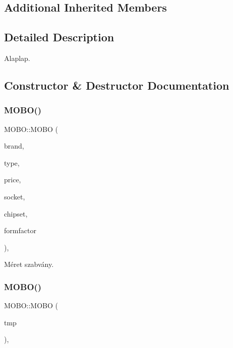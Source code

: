 \subsection*{Additional Inherited Members}


\subsection{Detailed Description}
Alaplap. 

\subsection{Constructor \& Destructor Documentation}
\mbox{\label{class_m_o_b_o_a3185de871765391ae3a0ffe4b0af7e5b}} 
\subsubsection{\texorpdfstring{MOBO()}{MOBO()}\hspace{0.1cm}{\footnotesize\ttfamily [1/2]}}
{\footnotesize\ttfamily M\+O\+B\+O\+::\+M\+O\+BO (\begin{DoxyParamCaption}\item[{\mbox{\hyperlink{class_string}{String}}}]{brand,  }\item[{\mbox{\hyperlink{class_string}{String}}}]{type,  }\item[{int}]{price,  }\item[{\mbox{\hyperlink{class_string}{String}}}]{socket,  }\item[{\mbox{\hyperlink{class_string}{String}}}]{chipset,  }\item[{\mbox{\hyperlink{class_string}{String}}}]{formfactor }\end{DoxyParamCaption})\hspace{0.3cm}{\ttfamily [inline]}, {\ttfamily [explicit]}}



Méret szabvány. 

\mbox{\label{class_m_o_b_o_ad6b4b2daac75d63d5d7f490d3cfeee6f}} 
\subsubsection{\texorpdfstring{MOBO()}{MOBO()}\hspace{0.1cm}{\footnotesize\ttfamily [2/2]}}
{\footnotesize\ttfamily M\+O\+B\+O\+::\+M\+O\+BO (\begin{DoxyParamCaption}\item[{\mbox{\hyperlink{struct_temp_input}{Temp\+Input}}}]{tmp }\end{DoxyParamCaption})\hspace{0.3cm}{\ttfamily [inline]}, {\ttfamily [explicit]}}



